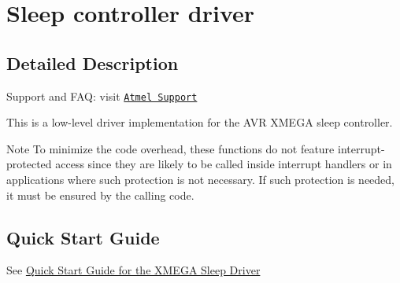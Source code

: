 \hypertarget{group__sleep__group}{\section{Sleep controller driver}
\label{group__sleep__group}
}


\subsection{Detailed Description}
Support and F\-A\-Q\-: visit \href{http://www.atmel.com/design-support/}{\tt Atmel Support}

This is a low-\/level driver implementation for the A\-V\-R X\-M\-E\-G\-A sleep controller.

\begin{DoxyNote}{Note}
To minimize the code overhead, these functions do not feature interrupt-\/protected access since they are likely to be called inside interrupt handlers or in applications where such protection is not necessary. If such protection is needed, it must be ensured by the calling code.
\end{DoxyNote}
\hypertarget{group__sleep__group_xmega_sleep_quickstart_section}{}\subsection{Quick Start Guide}\label{group__sleep__group_xmega_sleep_quickstart_section}
See \hyperlink{xmega_sleep_quickstart}{Quick Start Guide for the X\-M\-E\-G\-A Sleep Driver} 